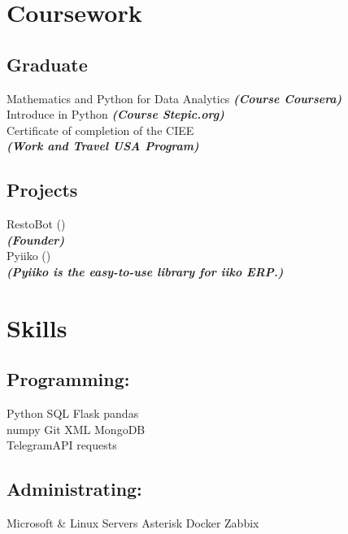 \documentclass[]{deedy-resume-openfont}
\begin{document}
\begin{minipage}[t]{0.33\textwidth}
\sectionsep


\section{Coursework}
\subsection{Graduate}
Mathematics and Python for Data Analytics 
{\footnotesize \textit{\textbf{(Course Coursera) }}} \\
Introduce in Python {\footnotesize \textit{\textbf{(Course Stepic.org) }}} \\
Certificate of completion of the CIEE \\
{\footnotesize \textit{\textbf{(Work and Travel USA Program) }}}
\sectionsep

\subsection{Projects}
RestoBot (\href{https://restobot.io}{}) \\
{\footnotesize \textit{\textbf{(Founder) }}} \\
Pyiiko (\href{https://github.com/gadzhi/pyiiko}{}) \\
{\footnotesize \textit{\textbf{(Pyiiko is the easy-to-use library for iiko ERP.) }}}
\sectionsep


\section{Skills}
\subsection{Programming:}
Python \textbullet{} SQL \textbullet{} Flask \textbullet{} pandas \\
\textbullet{} numpy \textbullet{} Git \textbullet{} XML \textbullet{} MongoDB \textbullet{} \\ 
\textbullet{} TelegramAPI \textbullet{} requests\\
\subsection{Administrating:}
Microsoft \& Linux Servers \textbullet{} Asterisk \textbullet{} Docker \textbullet{} Zabbix \\

\sectionsep

%
%

\end{minipage} 
\end{document}
